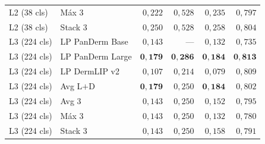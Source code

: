 \begin{table}[H]
\begin{tabular}{llrrrr}
L2 (38 cls)  & Máx 3                       & $0{,}222$          & $0{,}528$          & $0{,}235$          & $0{,}797$ \\
L2 (38 cls)  & Stack 3                     & $0{,}250$          & $0{,}528$          & $0{,}258$          & $0{,}804$ \\
\hline
L3 (224 cls) & LP PanDerm Base             & $0{,}143$          & ---                & $0{,}132$          & $0{,}735$ \\
L3 (224 cls) & LP PanDerm Large            & $\mathbf{0{,}179}$ & $\mathbf{0{,}286}$ & $\mathbf{0{,}184}$ & $\mathbf{0{,}813}$ \\
L3 (224 cls) & LP DermLIP v2               & $0{,}107$          & $0{,}214$          & $0{,}079$          & $0{,}809$ \\
L3 (224 cls) & Avg L$+$D                   & $\mathbf{0{,}179}$ & $0{,}250$          & $\mathbf{0{,}184}$ & $0{,}802$ \\
L3 (224 cls) & Avg 3                       & $0{,}143$          & $0{,}250$          & $0{,}152$          & $0{,}795$ \\
L3 (224 cls) & Máx 3                       & $0{,}143$          & $0{,}250$          & $0{,}132$          & $0{,}780$ \\
L3 (224 cls) & Stack 3                     & $0{,}143$          & $0{,}250$          & $0{,}158$          & $0{,}791$ \\
\hline
\end{tabular}
\end{table}

